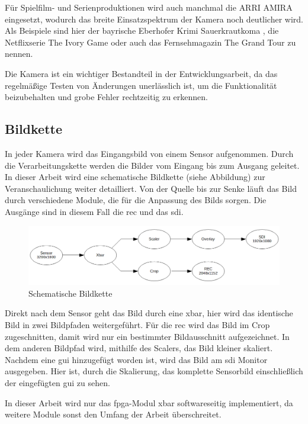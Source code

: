Für Spielfilm- und Serienproduktionen wird auch manchmal die \ac{ARRI} AMIRA eingesetzt, wodurch das breite Einsatzspektrum der Kamera noch deutlicher wird.
Als Beispiele sind hier der bayrische Eberhofer Krimi \glqq Sauerkrautkoma\grqq{} \cite{arrikrimi}, die Netflixserie \glqq The Ivory Game\grqq{} \cite{imdbivory} oder auch das Fernsehmagazin \glqq The Grand Tour\grqq{} \cite{imdbtour} zu nennen.
 
Die Kamera ist ein wichtiger Bestandteil in der Entwicklungsarbeit, da das regelmäßige Testen von Änderungen unerlässlich ist, um die Funktionalität beizubehalten und grobe Fehler rechtzeitig zu erkennen.

\subsection{Bildkette}\label{sec:bildkette}
In jeder Kamera wird das Eingangsbild von einem Sensor aufgenommen. Durch die Verarbeitungskette werden die Bilder vom Eingang bis zum Ausgang geleitet. In dieser Arbeit wird eine schematische Bildkette (siehe Abbildung) zur Veranschaulichung weiter detailliert. Von der Quelle bis zur Senke läuft das Bild durch verschiedene Module, die für die Anpassung des Bilds sorgen. Die Ausgänge sind in diesem Fall die \ac{rec} und das \ac{sdi}.

\begin{figure}[!hbtp]
	\centering
	\includegraphics[width = \linewidth]{pictures/2019-11-17_Bildkette.png}
	\smallskip
	\caption{Schematische Bildkette}
	\label{fig:bild}
\end{figure} 

Direkt nach dem Sensor geht das Bild durch eine \ac{xbar}, hier wird das identische Bild in zwei Bildpfaden weitergeführt. Für die \acl{rec} wird das Bild im Crop zugeschnitten, damit wird nur ein bestimmter Bildausschnitt aufgezeichnet. In dem anderen Bildpfad wird, mithilfe des Scalers, das Bild kleiner skaliert. Nachdem eine \ac{gui} hinzugefügt worden ist, wird das Bild am \ac{sdi} Monitor ausgegeben. Hier ist, durch die Skalierung, das komplette Sensorbild einschließlich der eingefügten \ac{gui} zu sehen.

In dieser Arbeit wird nur das \ac{fpga}-Modul \ac{xbar} softwareseitig implementiert, da weitere Module sonst den Umfang der Arbeit überschreitet.


